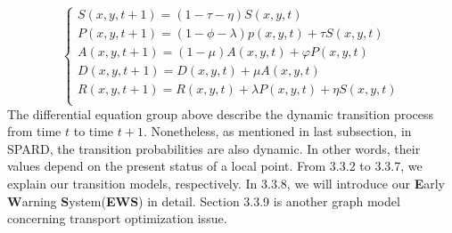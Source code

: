 \begin{equation}
 \left\{
\begin{aligned}
 S\left( x,y,t+1\right) =\left( 1-\tau -\eta \right) S\left( x,y,t\right) \\
 P\left( x,y,t+1\right) =(1-\phi-\lambda)p\left( x,y,t\right) +\tau S\left( x,y,t\right) \\
 A\left( x,y,t+1\right) =\left( 1-\mu \right) A\left( x,y,t\right) +\varphi P\left( x,y,t\right) \\
D\left( x,y,t+1\right) =D\left( x,y,t\right) +\mu A\left( x,y,t\right) \\
R\left( x,y,t+1\right) =R\left(x,y,t\right)+\lambda P\left( x,y,t\right) +\eta S\left( x,y,t\right) \\
\end{aligned}
\right.
\end{equation}
The differential equation group above describe the dynamic transition process from time $t$ to time $t+1$. Nonetheless, as mentioned in last subsection, in SPARD, the transition probabilities are also dynamic. In other words, their values depend on the present status of a local point. From 3.3.2 to 3.3.7, we explain our transition models, respectively. In 3.3.8, we will introduce our \textbf{E}arly \textbf{W}arning \textbf{S}ystem(\textbf{EWS}) in detail. Section 3.3.9 is another graph model concerning transport optimization issue.
